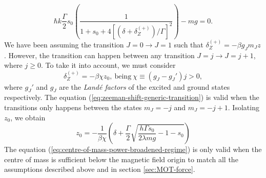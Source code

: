\begin{equation}
    \hbar k \frac{\Gamma}{2} s_0 \left( \frac{1}{1 + s_0 + 4[(\delta + \delta_{Z}^{(+)}) / \Gamma]^2}\right) - mg = 0.
\end{equation}
We have been assuming the transition $ J = 0 \longrightarrow J = 1 $ such that $ \delta_Z^{(+)} = - \beta g_J m_J z $. However, the transition can happen between any transition $ J = j \longrightarrow J = j + 1$, where $ j \geq 0 $. To take it into account, we must consider
\begin{equation}
     \delta_Z^{(+)} = - \beta \chi z_0,\ \textrm{being}\ \chi \equiv (g_J - g_J') j > 0,
     \label{eq:zeeman-shift-generic-transition}
\end{equation}
where $ g_J' $ and $ g_J $ are the \textit{Landé factors} of the excited and ground states respectively. The equation (\ref{eq:zeeman-shift-generic-transition}) is valid when the transitions only happens between the states $ m_J = -j $ and $ m_J = -j + 1 $. Isolating $ z_0 $, we obtain
\begin{equation}
    z_0 = - \frac{1}{\beta \chi} \left(\delta + \frac{\Gamma}{2} \sqrt{\frac{h \Gamma s_0}{2 \lambda m g} - 1 - s_0} \right)
    \label{eq:centre-of-mass-power-broadened-regime}
\end{equation}
The equation (\ref{eq:centre-of-mass-power-broadened-regime}) is only valid when the centre of mass is sufficient below the magnetic field origin to match all the assumptions described above and in section \ref{sec:MOT-force}.
